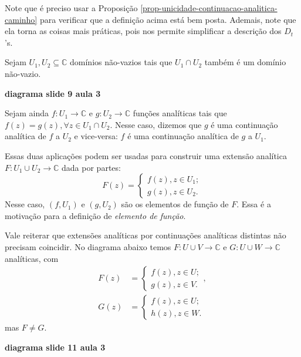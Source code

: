 Note que é preciso usar a Proposição \ref{prop-unicidade-continuacao-analitica-caminho}
para verificar que a definição acima está bem posta. Ademais, note que ela torna
as coisas mais práticas, pois nos permite simplificar a descrição dos $D_t$'s.

\begin{observacao}
Sejam $U_1, U_2\subseteq\mathbb{C}$ domínios não-vazios tais que $U_1\cap U_2$
também é um domínio não-vazio.

\begin{center}
    \textbf{diagrama slide 9 aula 3}
\end{center}

Sejam ainda $f:U_1\to\mathbb{C}$ e $g:U_2\to\mathbb{C}$ funções analíticas
tais que $f(z) = g(z), \forall z\in U_1\cap U_2$. Nesse caso, dizemos que
$g$ é uma continuação analítica de $f$ a $U_2$ e vice-versa: $f$ é 
uma continuação analítica de $g$ a $U_1$.

Essas duas aplicações podem ser usadas para construir uma extensão analítica
$F: U_1\cup U_2\to\mathbb{C}$ dada por partes:
\begin{equation*}
    F(z) = \begin{cases}
    f(z), z\in U_1; \\
    g(z), z\in U_2.
    \end{cases}
\end{equation*}
Nesse caso, $(f,U_1)$ e $(g,U_2)$ são os elementos de função de $F$. 
Essa é a motivação para a definição de \textit{elemento de função}.

Vale reiterar que extensões analíticas por continuações analíticas distintas
não precisam coincidir. No diagrama abaixo temos $F: U\cup V\to\mathbb{C}$
e $G:U\cup W\to\mathbb{C}$ analíticas, com
\begin{align*}
    F(z) &= \begin{cases}
    f(z), z\in U; \\
    g(z), z\in V.
    \end{cases}, \\
    G(z) &= \begin{cases}
    f(z), z\in U; \\
    h(z), z\in W.
    \end{cases}
\end{align*}
mas $F\neq G$.

\begin{center}
    \textbf{diagrama slide 11 aula 3}
\end{center}

\end{observacao}

